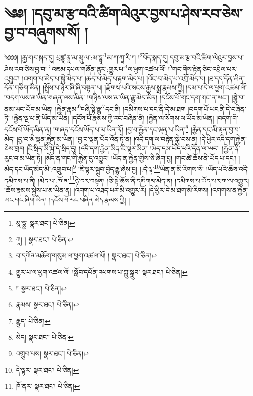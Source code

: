 \setcounter{footnote}{0} 
\chapter{༄༅། །དབུ་མ་རྩ་བའི་ཚིག་ལེའུར་བྱས་པ་ཤེས་རབ་ཅེས་བྱ་བ་བཞུགས་སོ། །}༄༅༅། །རྒྱ་གར་སྐད་དུ། པྲཛྙཱ་ནཱ་མ་མཱུ་ལ་:མ་དྷྱཱ་\footnote{མཱ་དྷྱ་  སྣར་ཐང་།  པེ་ཅིན། }མ་ཀ་ཀཱ་རི་ཀ །\footnote{ཀཱ། །  སྣར་ཐང་།  པེ་ཅིན། }བོད་སྐད་དུ། དབུ་མ་རྩ་བའི་ཚིག་ལེའུར་བྱས་པ་ཤེས་རབ་ཅེས་བྱ་བ། \footnote{བ་དཀོན་མཆོག་གསུམ་ལ་ཕྱག་འཚལ་ལོ། །   སྣར་ཐང་།  པེ་ཅིན། }འཇམ་དཔལ་གཞོན་ནུར་:གྱུར་པ་\footnote{གྱུར་པ་ལ་ཕྱག་འཚལ་ལོ། །སློབ་དཔོན་འཕགས་པ་ཀླུ་སྒྲུབ་  སྣར་ཐང་།  པེ་ཅིན། }ལ་ཕྱག་འཚལ་ལོ། །\footnote{།།  སྣར་ཐང་།  པེ་ཅིན། }གང་གིས་རྟེན་ཅིང་འབྲེལ་པར་འབྱུང་། །འགག་པ་མེད་པ་སྐྱེ་མེད་པ། །ཆད་པ་མེད་པ་རྟག་མེད་པ། །འོང་བ་མེད་པ་འགྲོ་མེད་པ། །ཐ་དད་དོན་མིན་དོན་གཅིག་མིན། །སྤྲོས་པ་ཉེར་ཞི་ཞི་བསྟན་པ། །རྫོགས་པའི་སངས་རྒྱས་སྨྲ་རྣམས་ཀྱི། །དམ་པ་དེ་ལ་ཕྱག་འཚལ་ལོ། །བདག་ལས་མ་ཡིན་གཞན་ལས་མིན། །གཉིས་ལས་མ་ཡིན་རྒྱུ་མེད་མིན། །དངོས་པོ་གང་དག་གང་ན་ཡང་། །སྐྱེ་བ་ནམ་ཡང་ཡོད་མ་ཡིན། །རྐྱེན་རྣམ་\footnote{རྣམས་  སྣར་ཐང་།  པེ་ཅིན། }བཞི་སྟེ་རྒྱུ་\footnote{རྒྱུད་  པེ་ཅིན། }དང་ནི། །དམིགས་པ་དང་ནི་དེ་མ་ཐག །བདག་པོ་ཡང་ནི་དེ་བཞིན་ཏེ། །རྐྱེན་ལྔ་པ་ནི་ཡོད་མ་ཡིན། །དངོས་པོ་རྣམས་ཀྱི་རང་བཞིན་ནི། །རྐྱེན་ལ་སོགས་ལ་ཡོད་མ་ཡིན། །བདག་གི་དངོས་པོ་ཡོད་མིན་ན། །གཞན་དངོས་ཡོད་པ་མ་ཡིན་ནོ། །བྱ་བ་རྐྱེན་དང་ལྡན་པ་ཡིན།\footnote{མེད།  སྣར་ཐང་།  པེ་ཅིན། } །རྐྱེན་དང་མི་ལྡན་བྱ་བ་མེད། །བྱ་བ་མི་ལྡན་རྐྱེན་མ་ཡིན། །བྱ་བ་ལྡན་ཡོད་འོན་ཏེ་ན། །འདི་དག་ལ་བརྟེན་སྐྱེ་བས་ན། །དེ་ཕྱིར་འདི་དག་རྐྱེན་ཅེས་གྲག །ཇི་སྲིད་མི་སྐྱེ་དེ་སྲིད་དུ། །འདི་དག་རྐྱེན་མིན་ཇི་ལྟར་མིན། །མེད་དམ་ཡོད་པའི་དོན་ལ་ཡང་། །རྐྱེན་ནི་རུང་བ་མ་ཡིན་ཏེ། །མེད་ན་གང་གི་རྐྱེན་དུ་འགྱུར། །ཡོད་ན་རྐྱེན་གྱིས་ཅི་ཞིག་བྱ། །གང་ཚེ་ཆོས་ནི་ཡོད་པ་དང་། །མེད་དང་ཡོད་མེད་མི་:འགྲུབ་པ།\footnote{འགྲུབ་པས།  སྣར་ཐང་།  པེ་ཅིན། } །ཇི་ལྟར་སྒྲུབ་བྱེད་རྒྱུ་ཞེས་བྱ། །:དེ་ལྟ་\footnote{དེ་ལྟར་  སྣར་ཐང་།  པེ་ཅིན། }ཡིན་ན་མི་རིགས་སོ། །ཡོད་པའི་ཆོས་འདི་དམིགས་པ་ནི། །མེད་པ་:ཁོ་ན་\footnote{ཁོ་ནར་  སྣར་ཐང་།  པེ་ཅིན། }ཉེ་བར་བསྟན། །ཅི་སྟེ་ཆོས་ནི་དམིགས་མེད་ན། །དམིགས་པ་ཡོད་པར་ག་ལ་འགྱུར། །ཆོས་རྣམས་སྐྱེས་པ་མ་ཡིན་ན། །འགག་པ་འཐད་པར་མི་འགྱུར་རོ། །དེ་ཕྱིར་དེ་མ་ཐག་མི་རིགས། །འགགས་ན་རྐྱེན་ཡང་གང་ཞིག་ཡིན། །དངོས་པོ་རང་བཞིན་མེད་རྣམས་ཀྱི། །
